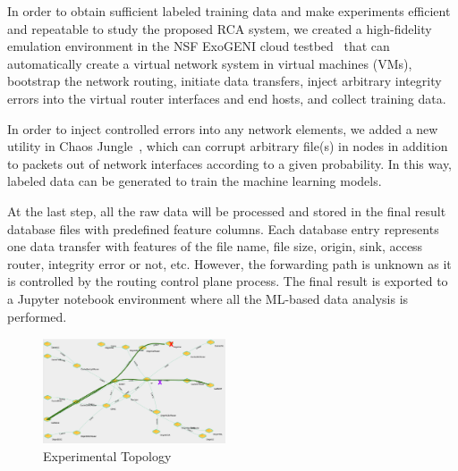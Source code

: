 In order to obtain sufficient labeled training data and make experiments efficient and repeatable to study the proposed RCA system, 
we created a high-fidelity emulation environment in the NSF ExoGENI cloud testbed~\cite{ExoGENI:web} that can automatically create a virtual network system in virtual machines (VMs), bootstrap the network routing, 
initiate data transfers, inject arbitrary integrity errors into the virtual router interfaces and end hosts, and collect training data.

In order to inject controlled errors into any network elements, we added a new utility in Chaos Jungle~\cite{swip:pearc:2019,chaosjungle:web}, which can corrupt arbitrary file(s) in nodes in addition to packets out of network interfaces according to a given probability. In this way, labeled data can be generated to train the machine learning models. 

At the last step, all the raw data will be processed and stored in the final result database files with predefined feature columns. Each database entry represents one data transfer with features of the file name, file size, origin, sink, access router, integrity error or not, etc. However, the forwarding path is unknown as it is controlled by the routing control plane process. The final result is exported to a Jupyter notebook environment where all the ML-based data analysis is performed.


\begin{figure}[!ht]
\begin{center}
\includegraphics[width=0.48\textwidth]{./figure/ChaosJungle}
\end{center}
\caption{Experimental Topology}
\label{fig:topology}
\end{figure}

